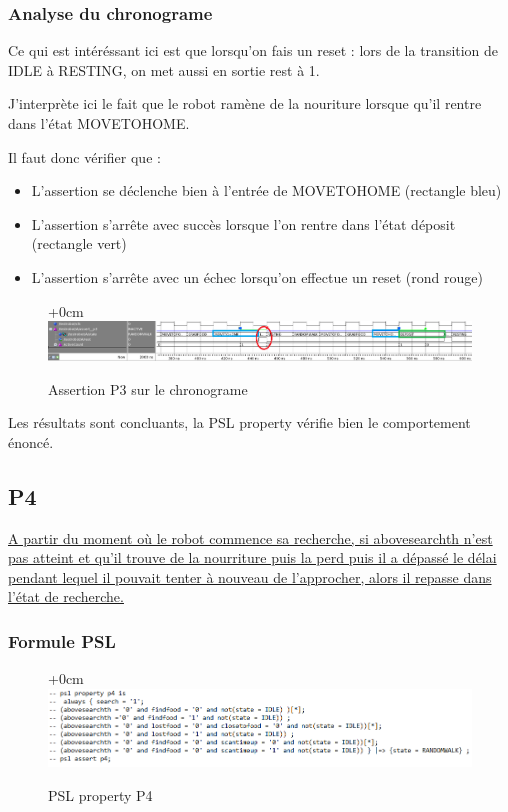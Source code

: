 \documentclass{article}
\begin{document}
\begin{landscape}
\subsubsection{Analyse du chronograme}
Ce qui est intéréssant ici est que lorsqu'on fais un reset : lors de la transition de IDLE à RESTING, on met aussi en sortie rest à 1. 

J'interprète ici le fait que le robot ramène de la nouriture lorsque qu'il rentre dans l'état MOVETOHOME.

Il faut donc vérifier que :

\begin{itemize}
\item  L'assertion se déclenche bien à l'entrée de MOVETOHOME (rectangle bleu)
\item L'assertion s'arrête avec succès lorsque l'on rentre dans l'état déposit (rectangle vert)
\item L'assertion s'arrête avec un échec lorsqu'on effectue un reset (rond rouge)
\end{itemize} 


\begin{figure}[!h]
\advance\leftskip+0cm
\includegraphics[scale=0.6]{PSL/P3-1.PNG}
\caption{Assertion P3 sur le chronograme }
\end{figure}


Les résultats sont concluants, la PSL property vérifie bien le comportement énoncé.

\newpage

\subsection{P4}
\uline{A partir du moment où le robot commence sa recherche, si abovesearchth n'est pas
atteint et qu'il trouve de la nourriture puis la perd puis il a dépassé le délai pendant lequel
il pouvait tenter à nouveau de l'approcher, alors il repasse dans l'état de recherche.}
\subsubsection{Formule PSL }
\begin{figure}[!h]
\advance\leftskip+0cm
\includegraphics[scale=0.7]{PSL/P4.PNG}
\caption{PSL property P4}
\end{figure}


\end{landscape}
\end{document}
